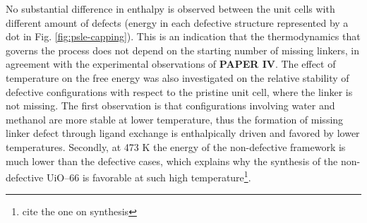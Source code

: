 No substantial difference in enthalpy is observed between the unit cells with different amount of defects (energy in each defective structure represented by a dot in Fig. \ref{fig:psle-capping}). This is an indication that the thermodynamics that governs the process does not depend on the starting number of missing linkers, in agreement with the experimental observations of \textbf{PAPER IV}. The effect of temperature on the free energy was also investigated on the relative stability of defective configurations with respect to the pristine unit cell, where the linker is not missing. The first observation is that configurations involving water and methanol are more stable at lower temperature, thus the formation of missing linker defect through ligand exchange is enthalpically driven and favored by lower temperatures. Secondly, at 473 K the energy of the non-defective framework is much lower than the defective cases, which explains why the synthesis of the non-defective UiO--66 is favorable at such high temperature\footnote{cite the one on synthesis}.

